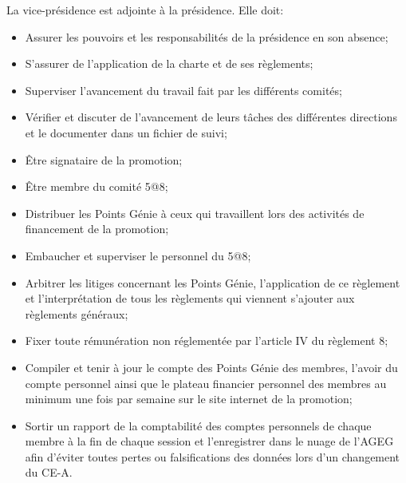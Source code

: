 La vice-présidence est adjointe à la présidence. Elle doit:
\begin{itemize}
    \item Assurer les pouvoirs et les responsabilités de la présidence en son absence;
    \item S'assurer de l'application de la charte et de ses règlements;
    \item Superviser l'avancement du travail fait par les différents comités;
    \item Vérifier et discuter de l’avancement de leurs tâches des différentes directions et le documenter dans un fichier de suivi;
    \item Être signataire de la promotion;
    \item Être membre du comité 5@8;
    \item Distribuer les Points Génie à ceux qui travaillent lors des activités de financement de la promotion;
    \item Embaucher et superviser le personnel du 5@8;
    \item Arbitrer les litiges concernant les Points Génie, l'application de ce règlement et l'interprétation de tous les règlements qui viennent s'ajouter aux règlements généraux;
    \item Fixer toute rémunération non réglementée par l'article IV du règlement 8;
    \item Compiler et tenir à jour le compte des Points Génie des membres, l'avoir du compte personnel ainsi que le plateau financier personnel des membres au minimum une fois par semaine sur le site internet de la promotion;
    \item Sortir un rapport de la comptabilité des comptes personnels de chaque membre à la fin de chaque session et l’enregistrer dans le nuage de l’AGEG afin d'éviter toutes pertes ou falsifications des données lors d'un changement du CE-A.
\end{itemize}

